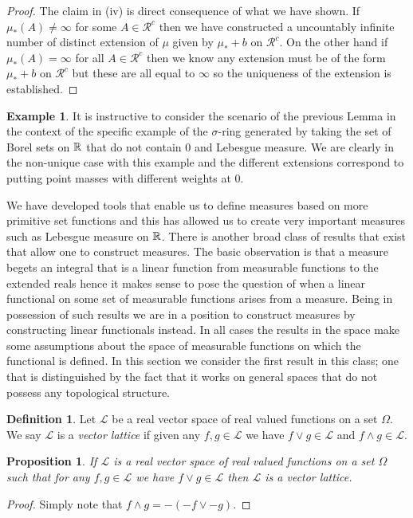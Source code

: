 \documentclass{amsart}
\newtheorem{prop}[thm]{Proposition}
\theoremstyle{remark}
\theoremstyle{definition}
\newtheorem{defn}[thm]{Definition}
\newtheorem{examp}[thm]{Example}
\begin{document}
\begin{proof}
The claim in (iv) is direct consequence of what we have shown.  If
$\mu_*(A) \neq \infty$ for some $A \in \mathcal{R}^c$ then we have
constructed a uncountably infinite number of distinct extension of
$\mu$ given by $\mu_* + b$ on $\mathcal{R}^c$.  On the other hand if
$\mu_*(A) = \infty$ for all $A \in \mathcal{R}^c$ then we know any
extension must be of the form $\mu_* + b$ on $\mathcal{R}^c$ but these
are all equal to $\infty$ so the uniqueness of the extension is established.
\end{proof}

\begin{examp}It is instructive to consider the scenario of the
  previous Lemma in the context of the specific example of the
  $\sigma$-ring generated by taking the set of Borel sets on $\mathbb{R}$
  that do not contain $0$ and Lebesgue measure.  We are clearly in the
  non-unique case with this example and the different extensions
  correspond to putting point masses with different weights at $0$.
\end{examp}
We have developed tools that enable us to define measures based on
more primitive set functions and this has allowed us to create very
important measures such as Lebesgue measure on $\mathbb{R}$.  There is
another broad class of results that exist that allow one to construct
measures.  The basic observation is that a measure begets an integral
that is a linear function from measurable functions to the extended
reals hence it makes sense to pose the question of when a linear
functional on some set of measurable functions arises from a measure.
Being in possession of such results we are in a position to construct
measures by constructing linear functionals instead.  In all cases the
results in the space make some assumptions about the space of
measurable functions on which the functional is defined.  In this
section we consider the first result in this class; one that is
distinguished by the fact that it works on general spaces that do not
possess any topological structure.

\begin{defn}Let $\mathcal{L}$ be a real vector space of real valued
  functions on a set $\Omega$.  We say $\mathcal{L}$ is a \emph{vector
    lattice} if given any $f,g \in \mathcal{L}$ we have $f \vee g \in
  \mathcal{L}$ and $f \wedge g \in \mathcal{L}$.
\end{defn}

\begin{prop}If $\mathcal{L}$ is a real vector space of real valued
  functions on a set $\Omega$ such that for any $f,g \in \mathcal{L}$
  we have $f \vee g \in \mathcal{L}$ then $\mathcal{L}$ is a vector lattice.
\end{prop}
\begin{proof}
Simply note that $f \wedge g = -(-f \vee -g)$.  
\end{proof}
\end{document}
